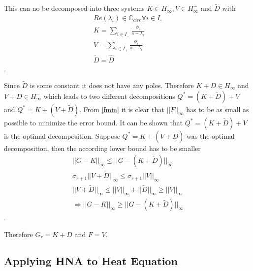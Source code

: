 This can no be decomposed into three systems \(K \in H_\infty, V \in H_{\infty}^-\) and \(\tilde{D}\) with
\begin{gather}
Re(\lambda_i) \in \mathbb{C}_{circ} \forall i \in I_{\circ} \\
K = \sum_{i \in I_-} \frac{\phi_i}{s-\lambda_i} \\
V = \sum_{i \in I_+} \frac{\phi_i}{s-\lambda_i} \\
\tilde{D} = \hat{D}
\end{gather}
.


Since \(\tilde{D}\) is some constant it does not have any poles.
Therefore \(K + D \in H_\infty\) and \(V + D \in H_{\infty}^-\) which leads to two different decompositions \(Q^{*} = (K + \tilde{D}) + V \) and \(Q^{*} = K + (V + \tilde{D})\).
From \ref{fmin} it is clear that \(||F||_{\infty}\) has to be as small as possible to minimize the error bound.
It can be shown that \(Q^{*} = (K + \tilde{D}) + V \) is the optimal decomposition.
Suppose \(Q^{*} = K + (V + \tilde{D})\) was the optimal decomposition, then the according lower bound has to be smaller
\begin{gather}
||G-K||_{\infty} \leq ||G-(K+\tilde{D})||_{\infty} \\
\sigma_{r+1}||V + \tilde{D}||_{\infty} \leq \sigma_{r+1}||V||_{\infty} \\
||V + \tilde{D}||_{\infty} \leq ||V||_{\infty} + ||\tilde{D}||_{\infty} \geq ||V||_{\infty} \\
\Rightarrow ||G-K||_{\infty} \geq ||G-(K+\tilde{D})||_{\infty}
\end{gather}
.

Therefore \(G_r = K + D\) and \(F = V\).

\subsection{Applying HNA to Heat Equation}

